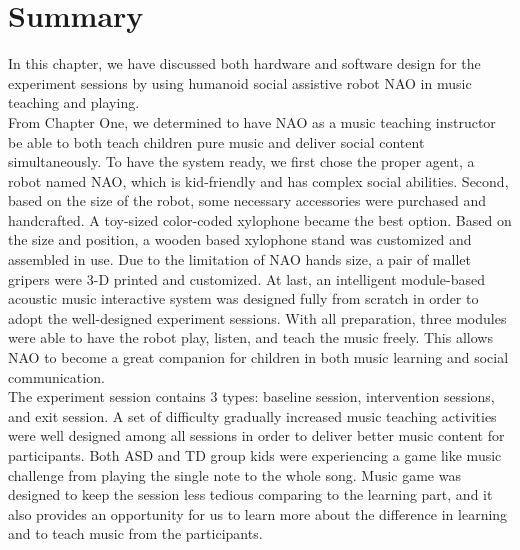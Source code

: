\section{Summary}
In this chapter, we have discussed both hardware and software design for the experiment sessions
by using humanoid social assistive robot NAO in music teaching and playing.\\

From Chapter One, we determined to have NAO as a music teaching instructor be able
to both teach children pure music and deliver social content simultaneously.
To have the system ready, we first chose the proper agent, a robot named NAO, which is
kid-friendly and has complex social abilities. Second, based on the size of the robot, some necessary
accessories were purchased and handcrafted. A toy-sized color-coded xylophone became the
best option. Based on the size and position, a wooden based xylophone stand was 
customized and assembled in use. Due to the limitation of NAO hands size, a pair of mallet gripers 
were 3-D printed and customized. At last, an intelligent module-based acoustic music 
interactive system was designed fully from scratch in order to adopt the well-designed experiment 
sessions. With all preparation, three modules were able to have the robot 
play, listen, and teach the music freely. This allows NAO to become a great companion for 
children in both music learning and social communication. \\

The experiment session contains 3 types: baseline session, intervention sessions, and exit session.
A set of difficulty gradually increased music teaching activities were well designed among all sessions
in order to deliver better music content for participants. Both ASD and TD group kids were
experiencing a game like music challenge from playing the single note to the whole song. Music
game was designed to keep the session less tedious comparing to the learning part, and it also
provides an opportunity for us to learn more about the difference in learning and to teach 
music from the participants.\\

